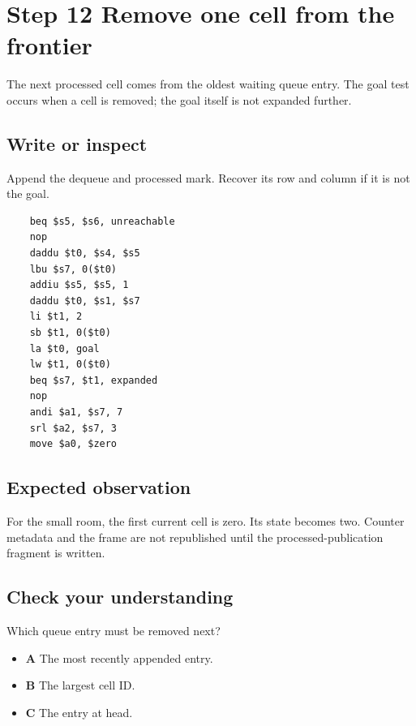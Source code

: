 \section{Step 12 Remove one cell from the frontier}\label{maze-s12}

The next processed cell comes from the oldest waiting queue entry. The goal test occurs when a cell is removed; the goal itself is not expanded further.

\subsection{Write or inspect}

Append the dequeue and processed mark. Recover its row and column if it is not the goal.

\begin{verbatim}
    beq $s5, $s6, unreachable
    nop
    daddu $t0, $s4, $s5
    lbu $s7, 0($t0)
    addiu $s5, $s5, 1
    daddu $t0, $s1, $s7
    li $t1, 2
    sb $t1, 0($t0)
    la $t0, goal
    lw $t1, 0($t0)
    beq $s7, $t1, expanded
    nop
    andi $a1, $s7, 7
    srl $a2, $s7, 3
    move $a0, $zero
\end{verbatim}

\subsection{Expected observation}

For the small room, the first current cell is zero. Its state becomes two. Counter metadata and the frame are not republished until the processed-publication fragment is written.

\subsection{Check your understanding}

Which queue entry must be removed next?

\begin{itemize}
  \item \textbf{A} The most recently appended entry.
  \item \textbf{B} The largest cell ID.
  \item \textbf{C} The entry at head.
\end{itemize}
